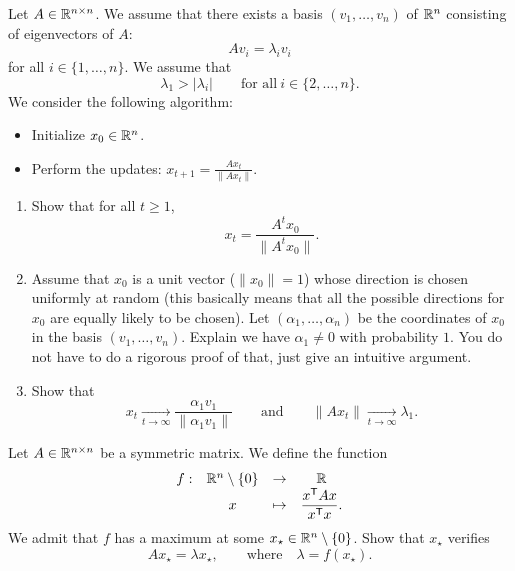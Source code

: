 \documentclass[11pt,nocut]{article}
\begin{document}
\begin{problem}[4 points]
	Let $A \in \mathbb{R}^{n \times n}$. We assume that there exists a basis $(v_1, \dots, v_n)$ of $\mathbb{R}^n$ consisting of eigenvectors of $A$:
	$$
	A v_i = \lambda_i v_i
	$$
	for all $i \in \{1, \dots, n\}$.
	We assume that 
	$$
	\lambda_1 > |\lambda_i| \qquad \text{for all} \ i \in \{2, \dots, n\}.
	$$
	We consider the following algorithm:
	\begin{itemize}
		\item Initialize $x_0 \in \mathbb{R}^n$.
		\item Perform the updates: $x_{t+1} = \frac{A x_t}{\|A x_t\|}$.
	\end{itemize}
	\begin{enumerate}[label=\normalfont(\textbf{\alph*})]
		\item Show that for all $t \geq 1$, 
			$$
			x_t = \frac{A^t x_0}{\|A^t x_0\|}.
			$$
		\item Assume that $x_0$ is a unit vector ($\|x_0\|=1$) whose direction is chosen uniformly at random (this basically means that all the possible directions for $x_0$ are equally likely to be chosen). Let $(\alpha_1, \dots, \alpha_n)$ be the coordinates of $x_0$ in the basis $(v_1, \dots, v_n)$. Explain we have $\alpha_1 \neq 0$ with probability $1$. You do not have to do a rigorous proof of that, just give an intuitive argument.
		\item Show that
			$$
			x_t \xrightarrow[t \to \infty]{} \frac{\alpha_1 v_1}{\|\alpha_1 v_1\|}
			\qquad \text{and} \qquad
			\|A x_t\| \xrightarrow[t \to \infty]{} \lambda_1.
			$$
	\end{enumerate}
\end{problem}

\vspace{1mm}


\begin{problem}[$\star$]
	Let $A \in \mathbb{R}^{n \times n}$ be a symmetric matrix. We define the function
	$$
	\begin{array}{cccc}
		f:& \mathbb{R}^n \setminus \{0\} & \to & \mathbb{R} \\
		  & x & \mapsto & \displaystyle \frac{x^{{\sf T}} A x}{x^{{\sf T}} x}.
	\end{array}
	$$
	We admit that $f$ has a maximum at some $x_{\star} \in \mathbb{R}^n \setminus \{0\}$.
	Show that $x_{\star}$ verifies
	$$
	A x_{\star} = \lambda x_{\star}, \qquad \text{where} \quad \lambda = f(x_{\star}).
	$$
\end{problem}
\vspace{1cm}
\centerline{}

%
%
\end{document}
